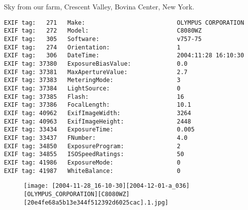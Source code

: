 \section{\protect{}}
\noindent Sky from our farm, Crescent Valley, Bovina Center, New York.
\noindent
\begin{lstlisting}
EXIF tag:   271   Make:                          OLYMPUS CORPORATION
EXIF tag:   272   Model:                         C8080WZ
EXIF tag:   305   Software:                      v757-75
EXIF tag:   274   Orientation:                   1
EXIF tag:   306   DateTime:                      2004:11:28 16:10:30
EXIF tag: 37380   ExposureBiasValue:             0.0
EXIF tag: 37381   MaxApertureValue:              2.7
EXIF tag: 37383   MeteringMode:                  3
EXIF tag: 37384   LightSource:                   0
EXIF tag: 37385   Flash:                         16
EXIF tag: 37386   FocalLength:                   10.1
EXIF tag: 40962   ExifImageWidth:                3264
EXIF tag: 40963   ExifImageHeight:               2448
EXIF tag: 33434   ExposureTime:                  0.005
EXIF tag: 33437   FNumber:                       4.0
EXIF tag: 34850   ExposureProgram:               2
EXIF tag: 34855   ISOSpeedRatings:               50
EXIF tag: 41986   ExposureMode:                  0
EXIF tag: 41987   WhiteBalance:                  0

\end{lstlisting}
\clearpage
\begin{figure}
\raggedleft
\texttt{[image: [2004-11-28\_16-10-30][2004-12-01-a\_036][OLYMPUS\_CORPORATION][C8080WZ][20e4fe68a5b13e344f512392d6025cac].1.jpg]}
\end{figure}


\clearpage
